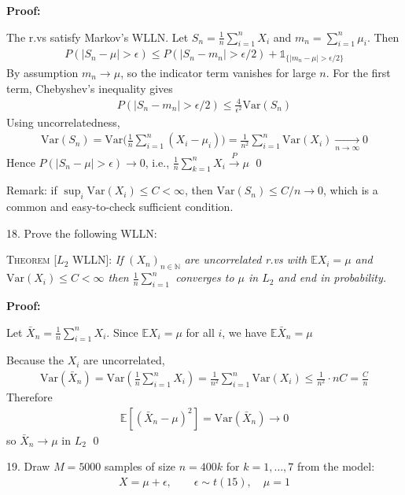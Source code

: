 \documentclass[10pt]{article}
\begin{document}
\textbf{Proof:}

The r.vs satisfy Markov's WLLN. Let $S_n = \frac{1}{n}\sum_{i = 1}^{n}X_i $ and $m_n = \sum_{i = 1}^{n}\mu_i $. Then 
\begin{gather*}
    P(|S_n - \mu| > \epsilon) \le P(|S_n - m_n| > \epsilon / 2) + \mathbb{1}_{\{|m_n - \mu| > \epsilon / 2\}}
\end{gather*}
By assumption $m_n \to \mu $, so the indicator term vanishes for large $n $. For the first term, Chebyshev's inequality gives 
\begin{gather*}
    P(|S_n - m_n| > \epsilon /2) \le \frac{4}{\epsilon^2}\text{Var}(S_n)
\end{gather*}
Using uncorrelatedness,
\begin{gather*}
    \text{Var}(S_n) = \text{Var}\Big(\frac{1}{n}\sum_{i = 1}^{n}(X_i - \mu_i)\Big) = \frac{1}{n^2}\sum_{i = 1}^{n}\text{Var}(X_i)\xrightarrow[n \to \infty]{}0
\end{gather*}
Hence $P(|S_n - \mu| > \epsilon) \to 0$, i.e., $\frac{1}{n}\sum_{k = 1}^{n}X_i \xrightarrow{P}\mu $ \qed 

Remark: if $\sup_i \text{Var}(X_i) \le C < \infty $, then $\text{Var}(S_n) \le C / n \to 0 $, which is a common and easy-to-check sufficient condition.

18. Prove the following WLLN: 

\textsc{Theorem [$L_2$ WLLN]}: \textit{If} $(X_n)_{n \in \mathbb{N}} $ \textit{are uncorrelated r.vs with $\mathbb{E}X_i = \mu $ and $\text{Var}(X_i) \le C < \infty $ then $\frac{1}{n}\sum_{i = 1}^{n} $ converges to $\mu $ in $L_2 $ and end in probability.}

\textbf{Proof:}

Let $\bar{X}_n = \frac{1}{n}\sum_{i = 1}^{n}X_i$. Since $\mathbb{E}X_i = \mu $ for all $i $, we have $\mathbb{E}\bar{X}_n = \mu $

Because the $X_i $ are uncorrelated,
\begin{gather*}
    \text{Var}(\bar{X}_n) = \text{Var}\left(\frac{1}{n}\sum_{i = 1}^{n}X_i\right) = \frac{1}{n^2}\sum_{i = 1}^{n}\text{Var}(X_i) \le \frac{1}{n^2} \cdot nC = \frac{C}{n}
\end{gather*}
Therefore 
\begin{gather*}
    \mathbb{E}[(\bar{X}_n - \mu)^2] = \text{Var}(\bar{X}_n) \to 0
\end{gather*}
so $\bar{X}_n \to \mu $ in $L_2 $ \qed

\newpage

19. Draw $M = 5000 $ samples of size $n = 400k $ for $k = 1, …, 7 $ from the model: 
\begin{gather*}
    X = \mu + \epsilon, \qquad \epsilon \sim t(15), \quad \mu = 1
\end{gather*}
\end{document}
